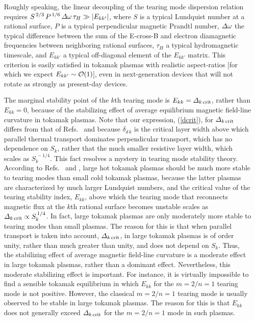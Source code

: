 \documentclass[12pt,prb,aps]{revtex4-1}
\begin{document}
Roughly speaking, the linear decoupling of the tearing mode dispersion relation requires
$S^{\,2/3}\,P^{\,1/6}\,{\mit\Delta}\omega\,\tau_H\gg |E_{kk'}|$, where $S$ is a typical Lundquist number at a rational surface, $P$ is a typical perpendicular magnetic Prandtl number, ${\mit\Delta}\omega$ the typical difference between the sum of the
E-cross-B and electron diamagnetic frequencies between neighboring rational surfaces, $\tau_H$ a typical hydromagnetic timescale, and $E_{kk'}$ a typical off-diagonal
element of the $E_{kk'}$ matrix.\cite{book} This criterion is easily satisfied in tokamak plasmas with realistic aspect-ratios [for which we expect $E_{kk'}\sim {\cal O}(1)$], even 
in next-generation devices that will not rotate as strongly as present-day devices.\cite{book}

The marginal stability point of the $k$th tearing mode is $E_{kk}=  {\mit\Delta}_{k\,{\rm crit}}$, rather than $E_{kk}=0$,\cite{fkr,ara} because of the
stabilizing effect of average equilibrium magnetic field-line curvature in tokamak plasmas.\cite{ggj,ggj1} Note that our expression, (\ref{dcrit}),  for
${\mit\Delta}_{k\,{\rm crit}}$ differs from that of Refs.~ and  because  $\delta_{d\,k}$ is the critical layer width above which
parallel thermal transport dominates perpendicular transport, which has no dependence on $S_k$, rather that the much smaller resistive
layer width, which scales as $S_k^{\,-1/4}$.\cite{lut,con1} This fact resolves a mystery in tearing mode stability theory. According to Refs.~ and ,
large hot tokamak plasmas should be much more stable to tearing modes than small cold tokamak plasmas, because the latter plasmas are characterized by much
larger Lundquist numbers, and the critical value of the tearing stability index, $E_{kk}$,  above which the tearing mode that reconnects
magnetic flux at the $k$th rational surface becomes unstable scales as ${\mit\Delta}_{k\,{\rm crit}}\propto S_k^{\,1/4}$. In fact, large  tokamak plasmas are only moderately more
stable to tearing modes than small  plasmas. The reason for this is that when parallel transport is taken into account, ${\mit\Delta}_{k\,{\rm crit}}$, in large tokamak
plasmas is of order unity, rather than much greater than unity, and does not depend on $S_k$. Thus, the stabilizing effect of average magnetic field-line curvature is a moderate effect in
large tokamak plasmas, rather than a dominant effect. Nevertheless, this moderate stabilizing effect is important. For instance, it is virtually impossible to find a
sensible tokamak equilibrium in which $E_{kk}$ for the $m=2/n=1$ tearing mode is not positive. However,  the classical $m=2/n=1$ tearing mode is usually observed to
be stable in large tokamak plasmas. The reason for this is that $E_{kk}$ does not generally exceed ${\mit\Delta}_{k\,{\rm crit}}$ for the $m=2/n=1$  mode in such  plasmas. 
\end{document}
